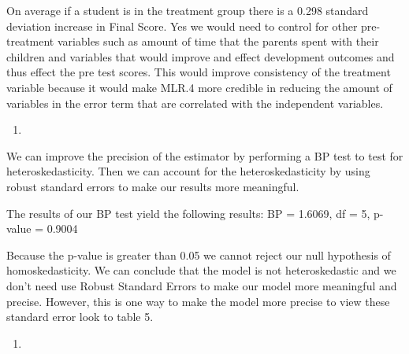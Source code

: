\documentclass[
  12pt,
  landscape]{article}
\begin{document}
On average if a student is in the treatment group there is a 0.298
standard deviation increase in Final Score. Yes we would need to control
for other pre-treatment variables such as amount of time that the
parents spent with their children and variables that would improve and
effect development outcomes and thus effect the pre test scores. This
would improve consistency of the treatment variable because it would
make MLR.4 more credible in reducing the amount of variables in the
error term that are correlated with the independent variables.

\begin{enumerate}
\def\labelenumi{(\roman{enumi})}
\item
\end{enumerate}

We can improve the precision of the estimator by performing a BP test to
test for heteroskedasticity. Then we can account for the
heteroskedasticity by using robust standard errors to make our results
more meaningful.

The results of our BP test yield the following results: BP = 1.6069, df
= 5, p-value = 0.9004

Because the p-value is greater than 0.05 we cannot reject our null
hypothesis of homoskedasticity. We can conclude that the model is not
heteroskedastic and we don't need use Robust Standard Errors to make our
model more meaningful and precise. However, this is one way to make the
model more precise to view these standard error look to table 5.

\begin{enumerate}
\def\labelenumi{(\alph{enumi})}
\setcounter{enumi}{9}
\item
\end{enumerate}
\end{document}
